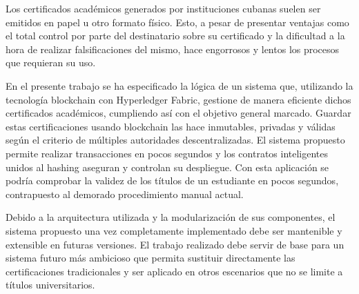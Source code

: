 \begin{conclusions}
Los certificados académicos generados por instituciones cubanas suelen ser emitidos en papel u otro formato físico. Esto, a pesar de presentar ventajas como el total control por parte del destinatario sobre su certificado y la dificultad a la hora de realizar falsificaciones del mismo, hace engorrosos y lentos los procesos que requieran su uso.
    
En el presente trabajo se ha especificado la lógica de un sistema que, utilizando la tecnología blockchain con Hyperledger Fabric, gestione de manera eficiente dichos certificados académicos, cumpliendo así con el objetivo general marcado. Guardar estas certificaciones usando blockchain las hace inmutables, privadas y válidas según el criterio de múltiples autoridades descentralizadas. El sistema propuesto permite realizar transacciones en pocos segundos y los contratos inteligentes unidos al hashing aseguran y controlan su despliegue. Con esta aplicación se podría comprobar la validez de los títulos de un estudiante en pocos segundos, contrapuesto al demorado procedimiento manual actual.

Debido a la arquitectura utilizada y la modularización de sus componentes, el sistema propuesto una vez completamente implementado debe ser mantenible y extensible en futuras versiones. El trabajo realizado debe servir de base para un sistema futuro más ambicioso que permita sustituir directamente las certificaciones tradicionales y ser aplicado en otros escenarios que no se limite a títulos universitarios. 
\end{conclusions}

